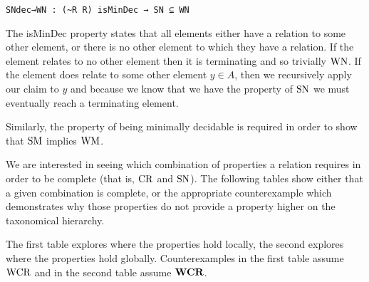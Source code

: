 \verb|SNdec→WN : (~R R) isMinDec → SN ⊆ WN| 


The isMinDec property states that all elements either have a relation to some other element, or 
there is no other element to which they have a relation. If the element relates to no other element then it is terminating 
and so trivially $\mathrm{WN}$. If the element does relate to some other element $y \in A$, then we recursively apply our claim to 
$y$ and because we know that we have the property of $\mathrm{SN}$ we must eventually reach a terminating element. 

Similarly, the property of being minimally decidable is required in order to show that $\mathrm{SM}$ implies $\mathrm{WM}$.

We are interested in seeing which combination of properties a relation requires in order to be complete (that is, $\mathrm{CR}$ and $\mathrm{SN}$). 
The following tables show either that a given combination is complete, or the appropriate counterexample which demonstrates why 
those properties do not provide a property higher on the taxonomical hierarchy. 

The first table explores where the properties hold locally, the second explores where the properties hold globally. Counterexamples in the 
first table assume $\mathrm{WCR}$ and in the second table assume $\mathbf{WCR}$.

